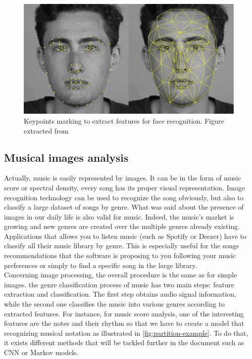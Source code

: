 \documentclass[11pt, openany]{report}
\theoremstyle{plain}
\theoremstyle{definition}
\theoremstyle{remark}
\begin{document}
\begin{figure}[h]
  \centering
  \includegraphics[scale=0.20]{figures/face-recognition-keypoints.jpeg}
  \caption{Keypoints marking to extract features for face recognition. Figure extracted from \cite{Face-Recognition-1}}
  \label{fig:face-recognition-keypoints}
\end{figure}

\subsection{Musical images analysis}
Actually, music is easily represented by images. It can be in the form of music score or spectral density, every song has its proper visual representation. Image recognition technology can be used to recognize the song obviously, but also to classify a large dataset of songs by genre. What was said about the presence of images in our daily life is also valid for music. Indeed, the music's market is growing and new genres are created over the multiple genres already existing. Applications that allows you to listen music (such as Spotify or Deezer) have to classify all their music library by genre. This is especially useful for the songs recommendations that the software is proposing to you following your music preferences or simply to find a specific song in the large library. \\ 

Concerning image processing, the overall procedure is the same as for simple images. the genre classification process of music has two main steps: feature extraction and classification. The first step obtains audio signal information, while the second one classifies the music into various genres according to extracted features. For instance, for music score analysis, one of the interesting features are the notes and their rhythm so that we have to create a model that recognizing musical notation as illustrated in \autoref{fig:partition-example}. To do that, it exists different methods that will be tackled further in the document such as CNN or Markov models. 
\end{document}
